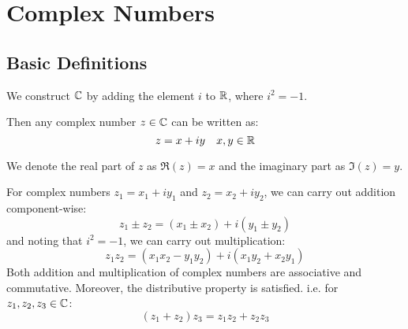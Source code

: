\documentclass[../main.tex]{subfiles}
\begin{document}
\chapter{Complex Numbers}
\section{Basic Definitions}
\begin{definition}
  We construct $\mathbb{C}$ by adding the element $i$ to $\mathbb{R}$, where $i^2 = -1$.

  Then any complex number $z \in \mathbb{C}$ can be written as:
  \[
    z = x + iy \quad x, y \in \mathbb{R}
  \]
\end{definition}
We denote the real part of $z$ as $\Re(z) = x$ and the imaginary part as $\Im(z) = y$.

For complex numbers $z_1 = x_1 + i y_1$ and $z_2 = x_2 + i y_2$, we can carry out addition component-wise:
\[
  z_1 \pm z_2 = (x_1 \pm x_2) + i(y_ 1 \pm y_2) 
\]
and noting that $i^2 = -1$, we can carry out multiplication:
\begin{equation}
  z_1 z_2 = (x_1 x_2 - y_1 y_2) + i(x_1 y_2 + x_2 y_1)
  \label{complexMult}
\end{equation}
Both addition and multiplication of complex numbers are associative and commutative.
Moreover, the distributive property is satisfied. i.e. for $z_1, z_2, z_3 \in \mathbb{C}$:
\[
  (z_1 + z_2)z_3 = z_1 z_2 + z_2 z_3
\]
\end{document}
